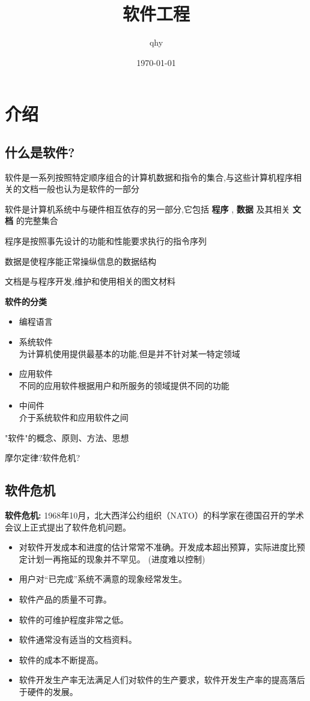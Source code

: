 \documentclass[UTF8,a4paper]{ctexart}
\author{ qhy }
\date{\today}
\title{软件工程}
\begin{document}
  \maketitle
  \tableofcontents
  \newpage

  \section{介绍}

  \subsection{什么是软件?}
  软件是一系列按照特定顺序组合的计算机数据和指令的集合,与这些计算机程序相关的文档一般也认为是软件的一部分

  软件是计算机系统中与硬件相互依存的另一部分,它包括 \textbf{程序} , \textbf{数据} 及其相关 \textbf{文档} 的完整集合

  程序是按照事先设计的功能和性能要求执行的指令序列

  数据是使程序能正常操纵信息的数据结构

  文档是与程序开发,维护和使用相关的图文材料

  \textbf{软件的分类}
  \begin{itemize}
    \item 编程语言
    \item 系统软件\\
    为计算机使用提供最基本的功能,但是并不针对某一特定领域
    \item 应用软件\\
    不同的应用软件根据用户和所服务的领域提供不同的功能
    \item 中间件\\
    介于系统软件和应用软件之间
  \end{itemize}

  "软件"的概念、原则、方法、思想

  摩尔定律?软件危机?

    \subsection{软件危机}
    \textbf{软件危机:} 1968年10月，北大西洋公约组织（NATO）的科学家在德国召开的学术会议上正式提出了软件危机问题。

    \begin{itemize}
      \item 对软件开发成本和进度的估计常常不准确。开发成本超出预算，实际进度比预定计划一再拖延的现象并不罕见。 (进度难以控制)
      \item 用户对“已完成”系统不满意的现象经常发生。
      \item 软件产品的质量不可靠。
      \item 软件的可维护程度非常之低。
      \item 软件通常没有适当的文档资料。
      \item 软件的成本不断提高。
      \item 软件开发生产率无法满足人们对软件的生产要求，软件开发生产率的提高落后于硬件的发展。
    \end{itemize}
\end{document}
